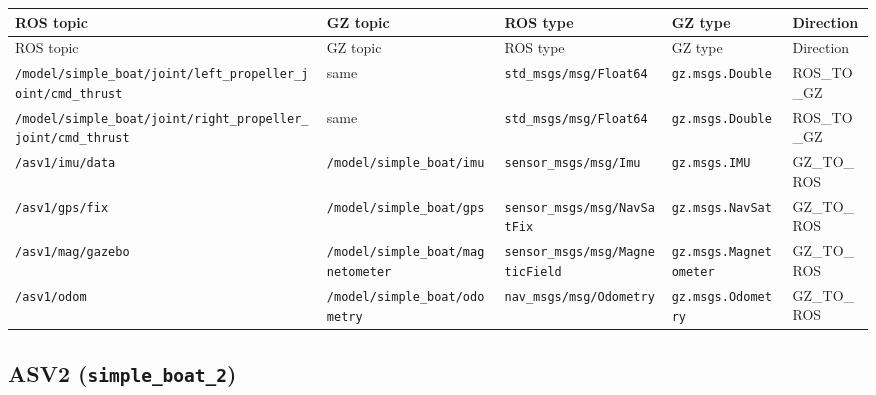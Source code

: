 \begin{center}
\small
\begin{longtable}{@{}p{2.1cm}p{2.1cm}p{2.1cm}p{2.1cm}p{3.2cm}@{}}
\toprule
ROS topic & GZ topic & ROS type & GZ type & Direction \\
\midrule
\endfirsthead
\toprule
ROS topic & GZ topic & ROS type & GZ type & Direction \\
\midrule
\endhead
\texttt{/model/simple\_boat/joint/left\_propeller\_joint/cmd\_thrust} & same & \texttt{std\_msgs/msg/Float64} & \texttt{gz.msgs.Double} & ROS\_TO\_GZ \\
\texttt{/model/simple\_boat/joint/right\_propeller\_joint/cmd\_thrust} & same & \texttt{std\_msgs/msg/Float64} & \texttt{gz.msgs.Double} & ROS\_TO\_GZ \\
\texttt{/asv1/imu/data} & \texttt{/model/simple\_boat/imu} & \texttt{sensor\_msgs/msg/Imu} & \texttt{gz.msgs.IMU} & GZ\_TO\_ROS \\
\texttt{/asv1/gps/fix} & \texttt{/model/simple\_boat/gps} & \texttt{sensor\_msgs/msg/NavSatFix} & \texttt{gz.msgs.NavSat} & GZ\_TO\_ROS \\
\texttt{/asv1/mag/gazebo} & \texttt{/model/simple\_boat/magnetometer} & \texttt{sensor\_msgs/msg/MagneticField} & \texttt{gz.msgs.Magnetometer} & GZ\_TO\_ROS \\
\texttt{/asv1/odom} & \texttt{/model/simple\_boat/odometry} & \texttt{nav\_msgs/msg/Odometry} & \texttt{gz.msgs.Odometry} & GZ\_TO\_ROS \\
\bottomrule
\end{longtable}
\end{center}


\subsection{ASV2 (\texttt{simple\_boat\_2})}


